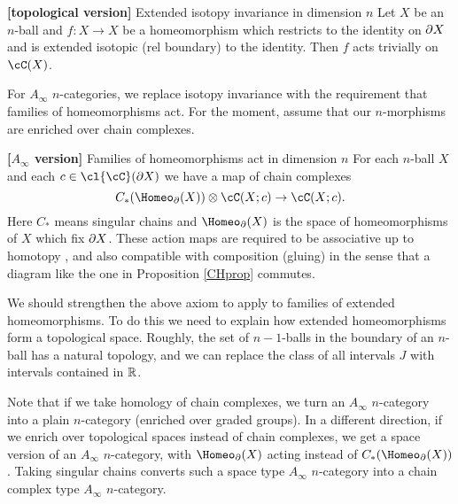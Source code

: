 \addtocounter{axiom}{-1}
\begin{axiom}{\textup{\textbf{[topological  version]}} Extended isotopy invariance in dimension $n$}
\label{axiom:extended-isotopies}
Let $X$ be an $n$-ball and $f: X\to X$ be a homeomorphism which restricts
to the identity on $\partial X$ and is extended isotopic (rel boundary) to the identity.
Then $f$ acts trivially on $\cC(X)$.
\end{axiom}


\smallskip

For $A_\infty$ $n$-categories, we replace
isotopy invariance with the requirement that families of homeomorphisms act.
For the moment, assume that our $n$-morphisms are enriched over chain complexes.

\addtocounter{axiom}{-1}
\begin{axiom}{\textup{\textbf{[$A_\infty$ version]}} Families of homeomorphisms act in dimension $n$}
For each $n$-ball $X$ and each $c\in \cl{\cC}(\bd X)$ we have a map of chain complexes
\[
	C_*(\Homeo_\bd(X))\ot \cC(X; c) \to \cC(X; c) .
\]
Here $C_*$ means singular chains and $\Homeo_\bd(X)$ is the space of homeomorphisms of $X$
which fix $\partial X$.
These action maps are required to be associative up to homotopy
, and also compatible with composition (gluing) in the sense that
a diagram like the one in Proposition \ref{CHprop} commutes.
\end{axiom}

We should strengthen the above axiom to apply to families of extended homeomorphisms.
To do this we need to explain how extended homeomorphisms form a topological space.
Roughly, the set of $n{-}1$-balls in the boundary of an $n$-ball has a natural topology,
and we can replace the class of all intervals $J$ with intervals contained in $\mathbb{R}$.

Note that if we take homology of chain complexes, we turn an $A_\infty$ $n$-category
into a plain $n$-category (enriched over graded groups).
In a different direction, if we enrich over topological spaces instead of chain complexes,
we get a space version of an $A_\infty$ $n$-category, with $\Homeo_\bd(X)$ acting 
instead of  $C_*(\Homeo_\bd(X))$.
Taking singular chains converts such a space type $A_\infty$ $n$-category into a chain complex
type $A_\infty$ $n$-category.

